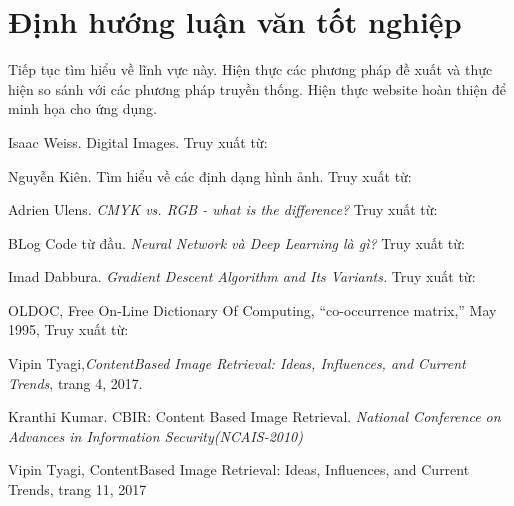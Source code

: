 \documentclass[a4paper,14pt]{extreport}
\begin{document}
\section{Định hướng luận văn tốt nghiệp}

Tiếp tục tìm hiểu về lĩnh vực này. Hiện thực các phương pháp đề xuất và thực hiện so sánh với các phương pháp truyền thống. Hiện thực website hoàn thiện để minh họa cho ứng dụng.

\medskip

\begin{thebibliography}{9}

Isaac Weiss. Digital Images. Truy xuất từ:\texttt{}

Nguyễn Kiên. Tìm hiểu về các định dạng hình ảnh. Truy xuất từ: \texttt{}

Adrien Ulens. \textit{CMYK vs. RGB - what is the difference?} Truy xuất từ: \\\texttt{}

BLog Code từ đầu. \textit{Neural Network và Deep Learning là gì?} Truy xuất từ: \texttt{}

Imad Dabbura. \textit{Gradient Descent Algorithm and Its Variants.} Truy xuất từ: \\\texttt{}

OLDOC, Free On-Line Dictionary Of Computing, “co-occurrence matrix,” May 1995, Truy xuất từ: \texttt{}

Vipin Tyagi,\textit{ContentBased Image Retrieval: Ideas, Influences, and Current Trends}, trang 4, 2017.


Kranthi Kumar. CBIR: Content Based Image Retrieval. \textit{National Conference on Advances in Information Security(NCAIS-2010)}

Vipin Tyagi, ContentBased Image Retrieval: Ideas, Influences, and Current Trends, trang 11, 2017



\end{thebibliography}
\end{document}

